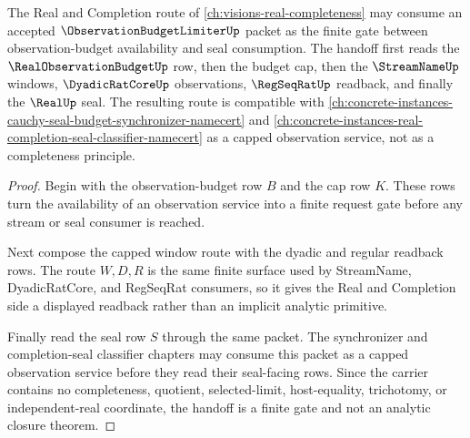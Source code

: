 \begin{theorem}
\label{thm:observation-budget-limiter-vision-handoff}
The Real and Completion route of \autoref{ch:visions-real-completeness} may consume an accepted $\ObservationBudgetLimiterUp$ packet as the finite gate between observation-budget availability and seal consumption. The handoff first reads the $\RealObservationBudgetUp$ row, then the budget cap, then the $\StreamNameUp$ windows, $\DyadicRatCoreUp$ observations, $\RegSeqRatUp$ readback, and finally the $\RealUp$ seal. The resulting route is compatible with \autoref{ch:concrete-instances-cauchy-seal-budget-synchronizer-namecert} and \autoref{ch:concrete-instances-real-completion-seal-classifier-namecert} as a capped observation service, not as a completeness principle.
\end{theorem}
\begin{proof}
Begin with the observation-budget row $B$ and the cap row $K$. These rows turn the availability of an observation service into a finite request gate before any stream or seal consumer is reached.

Next compose the capped window route with the dyadic and regular readback rows. The route $W,D,R$ is the same finite surface used by StreamName, DyadicRatCore, and RegSeqRat consumers, so it gives the Real and Completion side a displayed readback rather than an implicit analytic primitive.

Finally read the seal row $S$ through the same packet. The synchronizer and completion-seal classifier chapters may consume this packet as a capped observation service before they read their seal-facing rows. Since the carrier contains no completeness, quotient, selected-limit, host-equality, trichotomy, or independent-real coordinate, the handoff is a finite gate and not an analytic closure theorem.
\end{proof}

